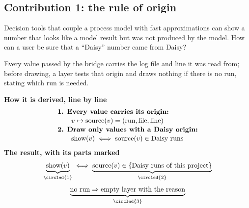 \subsection{Contribution 1: the rule of origin}
\begin{problem}
Decision tools that couple a process model with fast approximations can show a number that looks like a model result but was not produced by the model. How can a user be sure that a ``Daisy'' number came from Daisy?
\end{problem}
\begin{derivation}
Every value passed by the bridge carries the log file and line it was read from; before drawing, a layer tests that origin and draws nothing if there is no run, stating which run is needed.
\end{derivation}
\begin{keyresult}
\begin{pencil}
{\small\noindent\textbf{How it is derived, line by line}
\[\begin{array}{@{}l@{}}\textbf{1. Every value carries its origin:}\\[1pt]
\qquad v\mapsto\text{source}(v)=(\text{run},\text{file},\text{line})\\[1pt]
\textbf{2. Draw only values with a Daisy origin:}\\[1pt]
\qquad \text{show}(v)\iff\text{source}(v)\in\text{Daisy runs}
\end{array}\]}
\noindent\textbf{The result, with its parts marked}
\[\underbrace{\text{show}(v)}_{\circled{1}}\iff\underbrace{\text{source}(v)\in\{\text{Daisy runs of this project}\}}_{\circled{2}}\]
\[\underbrace{\text{no run}\Rightarrow\text{empty layer with the reason}}_{\circled{3}}\]
\end{pencil}
\end{keyresult}
\begin{pins}
\end{pins}


